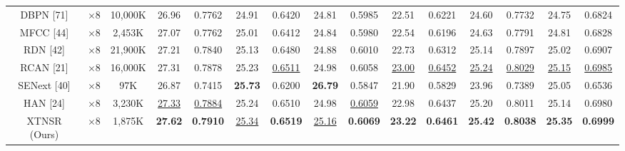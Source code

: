 \documentclass[twocolumn]{svjour3}          %
\begin{document}
\begin{table}
\begin{tabular}{|c|c|c|cc|cc|cc|cc|cc|cc|}
DBPN [71]& $\times8$&10,000K& \multicolumn{1}{c|}{26.96} &  0.7762 & \multicolumn{1}{c|}{24.91} & 0.6420&\multicolumn{1}{c|}{24.81} & 0.5985 & \multicolumn{1}{c|}{22.51  } &0.6221 & \multicolumn{1}{c|}{24.60 } &0.7732
&\multicolumn{1}{c|}{24.75  } &  0.6824       \\

MFCC [44]& $\times8$&2,453K& \multicolumn{1}{c|}{27.07} &  0.7762 & \multicolumn{1}{c|}{25.01} & 0.6412&\multicolumn{1}{c|}{24.84} & 0.5980 & \multicolumn{1}{c|}{22.54  } &0.6196 & \multicolumn{1}{c|}{24.63 } &0.7791 &\multicolumn{1}{c|}{24.81  } &  0.6828       \\

RDN [42]& $\times8$&21,900K& \multicolumn{1}{c|}{27.21} &  0.7840 & \multicolumn{1}{c|}{25.13} & 0.6480&\multicolumn{1}{c|}{24.88} & 0.6010 & \multicolumn{1}{c|}{22.73  } &0.6312 & \multicolumn{1}{c|}{25.14 } &0.7897 &\multicolumn{1}{c|}{25.02  } &  0.6907       \\

RCAN [21]& $\times8$&16,000K& \multicolumn{1}{c|}{27.31} &  0.7878 & \multicolumn{1}{c|}{25.23} & {\color{blue}\underline{0.6511}}&\multicolumn{1}{c|}{24.98} & 0.6058 & \multicolumn{1}{c|}{\color{blue}\underline{23.00}} &{\color{blue}\underline{0.6452}} & \multicolumn{1}{c|}{\color{blue}\underline{25.24 }} &{\color{blue}\underline{0.8029}}
&\multicolumn{1}{c|}{\color{blue}\underline{25.15}} &  {\color{blue}\underline{0.6985}}       \\

SENext [40] & $\times8$ &97K& \multicolumn{1}{c|}{26.87} &{0.7415} & \multicolumn{1}{c|}{\color{red}\textbf{25.73}} &{0.6200} & \multicolumn{1}{c|}{\color{red}\textbf{26.79}} &{0.5847} & \multicolumn{1}{c|}{21.90} &{0.5829} & \multicolumn{1}{c|}{23.96} &{0.7389} &\multicolumn{1}{c|}{25.05} &{0.6536}  \\


HAN [24] & $\times8$&3,230K& \multicolumn{1}{c|}{\color{blue}\underline{27.33}} &{\color{blue}\underline{0.7884}}   & \multicolumn{1}{c|}{25.24} & 0.6510   &\multicolumn{1}{c|}{24.98} &{\color{blue}\underline{0.6059}}   & \multicolumn{1}{c|}{22.98} &{0.6437} & \multicolumn{1}{c|}{25.20}  &{0.8011} &\multicolumn{1}{c|}{25.14} &{0.6980} \\

XTNSR (Ours) & $\times8$ &1,875K& \multicolumn{1}{c|}{\color{red}\textbf{27.62}} &{\color{red}\textbf{0.7910}} & \multicolumn{1}{c|}{\color{blue}\underline{25.34}} &{\color{red}\textbf{0.6519}} & \multicolumn{1}{c|}{\color{blue}\underline{25.16}} &{\color{red}\textbf{0.6069}} & \multicolumn{1}{c|}{\color{red}\textbf{23.22}} &{\color{red}\textbf{0.6461}} & \multicolumn{1}{c|}{\color{red}\textbf{25.42}} &{\color{red}\textbf{0.8038}} &\multicolumn{1}{c|}{\color{red}\textbf{25.35}} &{\color{red}\textbf{0.6999}}  \\

\hline

\end{tabular}
\end{table}
\end{document}
